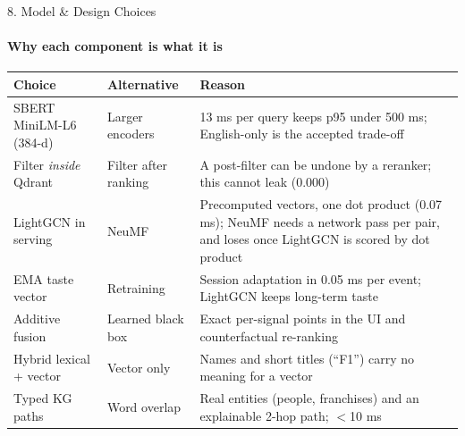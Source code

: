 \documentclass[aspectratio=169, 11pt]{beamer}
\begin{document}
\begin{frame}{8. Model \& Design Choices}
    \framesubtitle{Why each component is what it is}
    \scriptsize
    \renewcommand{\arraystretch}{1.25}
    \begin{tabular}{L{2.7cm} L{3.4cm} L{6.4cm}}
        \toprule
        \textbf{Choice} & \textbf{Alternative} & \textbf{Reason} \\
        \midrule
        SBERT MiniLM-L6 (384-d) & Larger encoders & 13 ms per query keeps p95 under 500 ms; English-only is the accepted trade-off \\
        Filter \emph{inside} Qdrant & Filter after ranking & A post-filter can be undone by a reranker; this cannot leak (0.000) \\
        LightGCN in serving & NeuMF & Precomputed vectors, one dot product (0.07 ms); NeuMF needs a network pass per pair, and loses once LightGCN is scored by dot product \\
        EMA taste vector & Retraining & Session adaptation in 0.05 ms per event; LightGCN keeps long-term taste \\
        Additive fusion & Learned black box & Exact per-signal points in the UI and counterfactual re-ranking \\
        Hybrid lexical + vector & Vector only & Names and short titles (``F1'') carry no meaning for a vector \\
        Typed KG paths & Word overlap & Real entities (people, franchises) and an explainable 2-hop path; $<$10 ms \\
        \bottomrule
    \end{tabular}
\end{frame}
\end{document}
